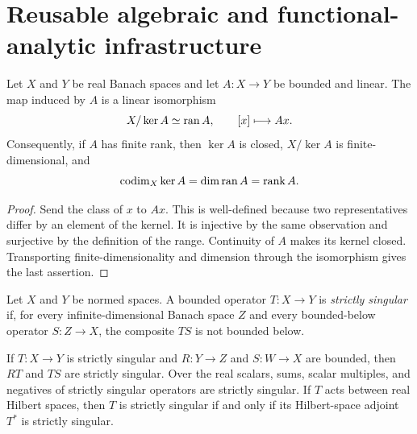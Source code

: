 \section{Reusable algebraic and functional-analytic infrastructure}

\begin{lemma}\label{lem:quotient-range}
Let $X$ and $Y$ be real Banach spaces and let $A:X\to Y$ be bounded and linear. The map
induced by $A$ is a linear isomorphism
\[
  X/\ker A\simeq\operatorname{ran} A,\qquad [x]\longmapsto Ax.
\]
Consequently, if $A$ has finite rank, then $\ker A$ is closed, $X/\ker A$ is finite-dimensional,
and
\[
  \operatorname{codim}_X\ker A=\dim\operatorname{ran} A=\operatorname{rank} A.
\]
\leanok
\end{lemma}

\begin{proof}
Send the class of $x$ to $Ax$. This is well-defined because two representatives differ by an
element of the kernel. It is injective by the same observation and surjective by the definition
of the range. Continuity of $A$ makes its kernel closed. Transporting finite-dimensionality and
dimension through the isomorphism gives the last assertion.
\end{proof}

\begin{definition}\label{def:strictly-singular}
Let $X$ and $Y$ be normed spaces.  A bounded operator $T:X\to Y$ is
\emph{strictly singular} if, for every infinite-dimensional Banach space $Z$ and every
bounded-below operator $S:Z\to X$, the composite $TS$ is not bounded below.
\leanok
\end{definition}

\begin{lemma}
\label{lem:strictly-singular-comp}
If $T:X\to Y$ is strictly singular and $R:Y\to Z$ and $S:W\to X$ are bounded, then
$RT$ and $TS$ are strictly singular.  Over the real scalars, sums, scalar multiples, and
negatives of strictly singular operators are strictly singular.  If $T$ acts between real
Hilbert spaces, then $T$ is strictly singular if and only if its Hilbert-space adjoint $T^*$ is
strictly singular.
\leanok
\end{lemma}

